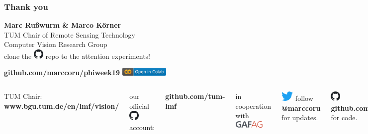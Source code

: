 \documentclass[%
  aspectratio=169,
  9pt,
  USenglish,
  light,
  mathserif,
  professionalfont,
  affiliationintitlepagehead,
  titlegraphic,
   affiliation,
]{beamer}
\begin{document}
\begin{frame}
	\frametitle{Thank you}
	\vspace{-1em}
	{\Large\centering 
		\textbf{Marc Rußwurm \& Marco Körner} \\
	
		TUM Chair of Remote Sensing Technology \\
		
		\centering Computer Vision Research Group \\
	
	
	\vspace{1em}
	clone the \includegraphics[width=5mm]{images/github} repo to the attention experiments! 
	
	\centering\textbf{github.com/marccoru/phiweek19}
	\includegraphics[height=4mm]{images/colab-badge.png}
	
}

	\vspace{2em}
	\Large 
	\begin{columns}[t]
		TUM Chair: \textbf{www.bgu.tum.de/en/lmf/vision/}
	
		our official \includegraphics[width=5mm]{images/github} account: 
		
		{\textbf{github.com/tum-lmf}}
		
		\vspace{1em}
		
		in cooperation with \includegraphics[height=1em]{images/GAF_logo}
		
		
		\includegraphics[height=5mm]{images/twitter} follow \textbf{@marccoru} for updates.
		
		\vspace{1em}
		\includegraphics[height=5mm]{images/github} \textbf{github.com/marccoru} for code.
		
		\vspace{1em}
		and \textbf{marccoru.github.io}
		
	\end{columns}
	
\end{frame}
\backupbegin

%
\backupend
\end{document}
